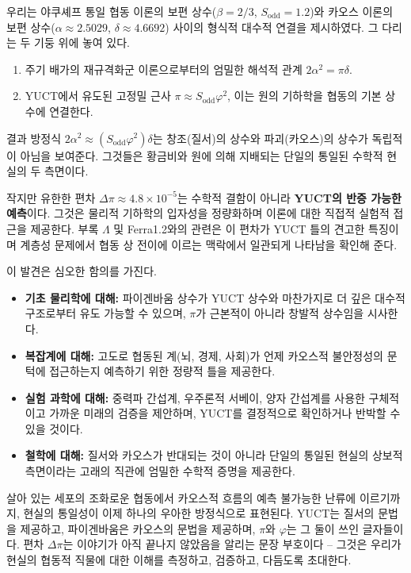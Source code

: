 \documentclass[11pt,a4paper]{article}
\begin{document}
	우리는 야쿠셰프 통일 협동 이론의 보편 상수(\(\beta = 2/3\), \(S_{\mathrm{odd}} = 1.2\))와 카오스 이론의 보편 상수(\(\alpha \approx 2.5029\), \(\delta \approx 4.6692\)) 사이의 형식적 대수적 연결을 제시하였다. 그 다리는 두 기둥 위에 놓여 있다.
	\begin{enumerate}
		\item 주기 배가의 재규격화군 이론으로부터의 엄밀한 해석적 관계 \(2\alpha^2 = \pi \delta\).
		\item YUCT에서 유도된 고정밀 근사 \(\pi \approx S_{\mathrm{odd}}\varphi^2\), 이는 원의 기하학을 협동의 기본 상수에 연결한다.
	\end{enumerate}
	
	결과 방정식 \(2\alpha^2 \approx (S_{\mathrm{odd}}\varphi^2)\delta\)는 창조(질서)의 상수와 파괴(카오스)의 상수가 독립적이 아님을 보여준다. 그것들은 황금비와 원에 의해 지배되는 단일의 통일된 수학적 현실의 두 측면이다.
	
	작지만 유한한 편차 \(\Delta\pi \approx 4.8\times10^{-5}\)는 수학적 결함이 아니라 \textbf{YUCT의 반증 가능한 예측}이다. 그것은 물리적 기하학의 입자성을 정량화하며 이론에 대한 직접적 실험적 접근을 제공한다. 부록 \(\Lambda\) 및 Ferra1.2와의 관련은 이 편차가 YUCT 틀의 견고한 특징이며 계층성 문제에서 협동 상 전이에 이르는 맥락에서 일관되게 나타남을 확인해 준다.
	
	이 발견은 심오한 함의를 가진다.
	\begin{itemize}
		\item \textbf{기초 물리학에 대해:} 파이겐바움 상수가 YUCT 상수와 마찬가지로 더 깊은 대수적 구조로부터 유도 가능할 수 있으며, \(\pi\)가 근본적이 아니라 창발적 상수임을 시사한다.
		\item \textbf{복잡계에 대해:} 고도로 협동된 계(뇌, 경제, 사회)가 언제 카오스적 불안정성의 문턱에 접근하는지 예측하기 위한 정량적 틀을 제공한다.
		\item \textbf{실험 과학에 대해:} 중력파 간섭계, 우주론적 서베이, 양자 간섭계를 사용한 구체적이고 가까운 미래의 검증을 제안하며, YUCT를 결정적으로 확인하거나 반박할 수 있을 것이다.
		\item \textbf{철학에 대해:} 질서와 카오스가 반대되는 것이 아니라 단일의 통일된 현실의 상보적 측면이라는 고래의 직관에 엄밀한 수학적 증명을 제공한다.
	\end{itemize}
	
	살아 있는 세포의 조화로운 협동에서 카오스적 흐름의 예측 불가능한 난류에 이르기까지, 현실의 통일성이 이제 하나의 우아한 방정식으로 표현된다. YUCT는 질서의 문법을 제공하고, 파이겐바움은 카오스의 문법을 제공하며, \(\pi\)와 \(\varphi\)는 그 둘이 쓰인 글자들이다. 편차 \(\Delta\pi\)는 이야기가 아직 끝나지 않았음을 알리는 문장 부호이다 – 그것은 우리가 현실의 협동적 직물에 대한 이해를 측정하고, 검증하고, 다듬도록 초대한다.
	
\end{document}
